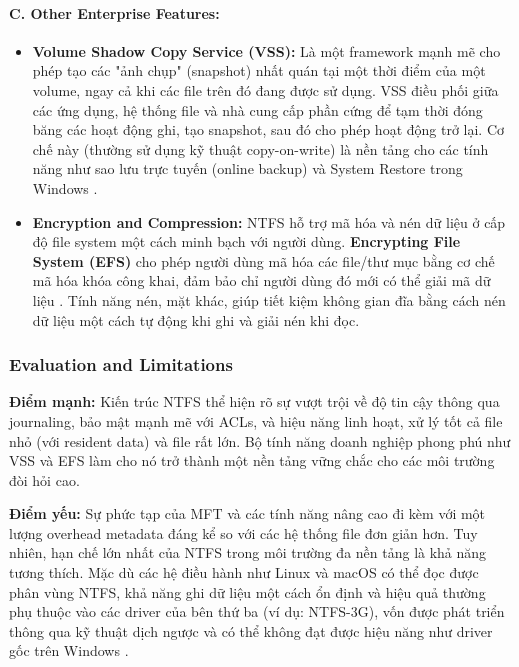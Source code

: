 \documentclass[12pt]{article}
\begin{document}
\paragraph{C. Other Enterprise Features:}
\begin{itemize}
    \item \textbf{Volume Shadow Copy Service (VSS):} Là một framework mạnh mẽ cho phép tạo các "ảnh chụp" (snapshot) nhất quán tại một thời điểm của một volume, ngay cả khi các file trên đó đang được sử dụng. VSS điều phối giữa các ứng dụng, hệ thống file và nhà cung cấp phần cứng để tạm thời đóng băng các hoạt động ghi, tạo snapshot, sau đó cho phép hoạt động trở lại. Cơ chế này (thường sử dụng kỹ thuật copy-on-write) là nền tảng cho các tính năng như sao lưu trực tuyến (online backup) và System Restore trong Windows \parencite{MicrosoftVSS}.
    \item \textbf{Encryption and Compression:} NTFS hỗ trợ mã hóa và nén dữ liệu ở cấp độ file system một cách minh bạch với người dùng. \textbf{Encrypting File System (EFS)} cho phép người dùng mã hóa các file/thư mục bằng cơ chế mã hóa khóa công khai, đảm bảo chỉ người dùng đó mới có thể giải mã dữ liệu \parencite{WafaTech2025EFS}. Tính năng nén, mặt khác, giúp tiết kiệm không gian đĩa bằng cách nén dữ liệu một cách tự động khi ghi và giải nén khi đọc.
\end{itemize}

\subsubsection{Evaluation and Limitations}
\textbf{Điểm mạnh:} Kiến trúc NTFS thể hiện rõ sự vượt trội về độ tin cậy thông qua journaling, bảo mật mạnh mẽ với ACLs, và hiệu năng linh hoạt, xử lý tốt cả file nhỏ (với resident data) và file rất lớn. Bộ tính năng doanh nghiệp phong phú như VSS và EFS làm cho nó trở thành một nền tảng vững chắc cho các môi trường đòi hỏi cao.

\textbf{Điểm yếu:} Sự phức tạp của MFT và các tính năng nâng cao đi kèm với một lượng overhead metadata đáng kể so với các hệ thống file đơn giản hơn. Tuy nhiên, hạn chế lớn nhất của NTFS trong môi trường đa nền tảng là khả năng tương thích. Mặc dù các hệ điều hành như Linux và macOS có thể đọc được phân vùng NTFS, khả năng ghi dữ liệu một cách ổn định và hiệu quả thường phụ thuộc vào các driver của bên thứ ba (ví dụ: NTFS-3G), vốn được phát triển thông qua kỹ thuật dịch ngược và có thể không đạt được hiệu năng như driver gốc trên Windows \parencite{Dhjaku2019}.
\end{document}
